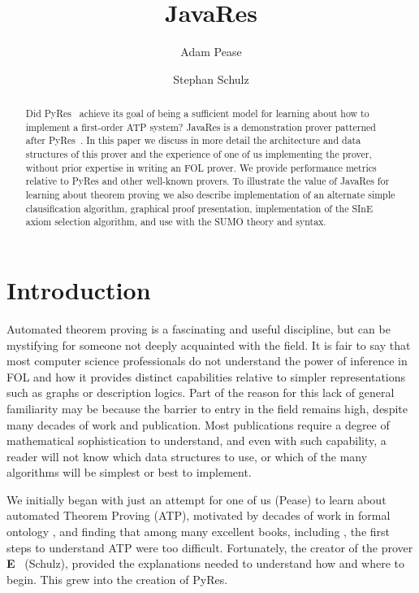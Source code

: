 \documentclass{llncs}
\title{JavaRes}
\author{Adam Pease\inst{2}
        \and Stephan Schulz\inst{1}
  }
\institute{
  Articulate Software, USA,
  \email{\tt apease@articulatesoftware.com}
  \and
  DHBW Stuttgart, Germany,
  \email{\tt schulz@eprover.org}
}
\begin{document}
\maketitle


\begin{abstract}
  Did PyRes~\cite{SP:IJCAR-2020} achieve its goal of being a
  sufficient model for learning about how to implement a first-order
  ATP system?  JavaRes is a demonstration prover patterned after
  PyRes~\cite{SP:IJCAR-2020}.  In this paper we discuss in more detail
  the architecture and data structures of this prover and the
  experience of one of us implementing the prover, without prior
  expertise in writing an FOL prover.  We provide performance metrics
  relative to PyRes and other well-known provers.  To illustrate the
  value of JavaRes for learning about theorem proving we also describe
  implementation of an alternate simple clausification algorithm,
  graphical proof presentation, implementation of the SInE axiom
  selection algorithm, and use with the SUMO theory and syntax.
\end{abstract}

\section{Introduction}

Automated theorem proving is a fascinating and useful discipline, but
can be mystifying for someone not deeply acquainted with the field.
It is fair to say that most computer science professionals do not
understand the power of inference in FOL and how it provides distinct
capabilities relative to simpler representations such as graphs or
description logics.  Part of the reason for this lack of general
familiarity may be because the barrier to entry in the field remains
high, despite many decades of work and publication.  Most publications
require a degree of mathematical sophistication to understand, and
even with such capability, a reader will not know which data
structures to use, or which of the many algorithms will be simplest or
best to implement.

We initially began with just an attempt for one of us (Pease) to learn
about automated Theorem Proving (ATP), motivated by decades of work in
formal ontology \cite{np01,p11}, and finding that among many excellent
books, including \cite{Harrison:HPL-2009}, the first steps to
understand ATP were too difficult.  Fortunately, the creator of the
prover \textbf{E}~\cite{Schulz:AICOM-2002,SCV:CADE-2019} (Schulz),
provided the explanations needed to understand how and where to begin.
This grew into the creation of PyRes.
\end{document}
